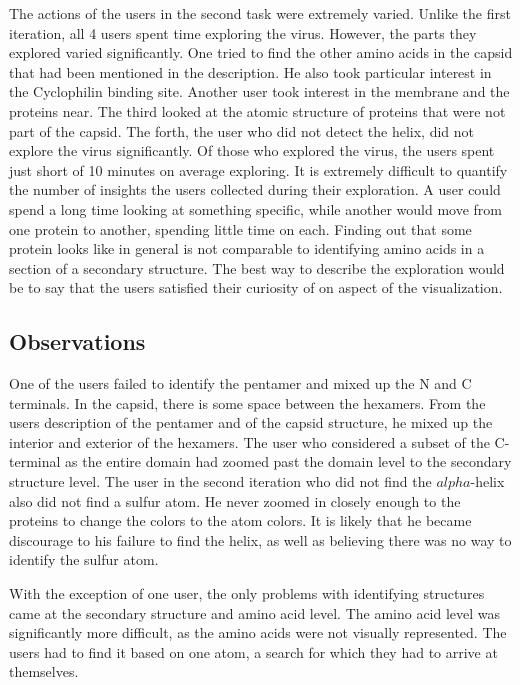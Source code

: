 \documentclass[review,journal]{vgtc}         %
\begin{document}
The actions of the users in the second task were extremely varied. 
Unlike the first iteration, all 4 users spent time exploring the virus. 
However, the parts they explored varied significantly. 
One tried to find the other amino acids in the capsid that had been mentioned in the description. 
He also took particular interest in the Cyclophilin binding site. 
Another user took interest in the membrane and the proteins near. 
The third looked at the atomic structure of proteins that were not part of the capsid. 
The forth, the user who did not detect the helix, did not explore the virus significantly.
Of those who explored the virus, the users spent just short of 10 minutes on average exploring.
It is extremely difficult to quantify the number of insights the users collected during their exploration.
A user could spend a long time looking at something specific, while another would move from one protein to another, spending little time on each.
Finding out that some protein looks like in general is not comparable to identifying amino acids in a section of a secondary structure.
The best way to describe the exploration would be to say that the users satisfied their curiosity of on aspect of the visualization.




\subsection{Observations}
One of the users failed to identify the pentamer and mixed up the N and C terminals. 
In the capsid, there is some space between the hexamers. 
From the users description of the pentamer and of the capsid structure, he mixed up the interior and exterior of the hexamers. 
The user who considered a subset of the C-terminal as the entire domain had zoomed past the domain level to the secondary structure level.
The user in the second iteration who did not find the $alpha$-helix also did not find a sulfur atom. He never zoomed in closely enough to the proteins to change the colors to the atom colors. It is likely that he became discourage to his failure to find the helix, as well as believing there was no way to identify the sulfur atom.

With the exception of one user, the only problems with identifying structures came at the secondary structure and amino acid level. 
The amino acid level was significantly more difficult, as the amino acids were not visually represented. 
The users had to find it based on one atom, a search for which they had to arrive at themselves. 
\end{document}
